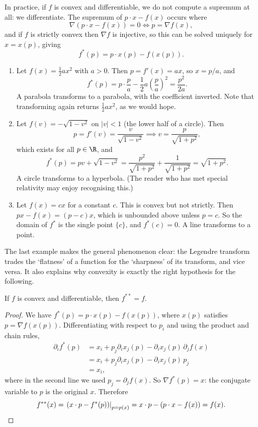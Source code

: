 \documentclass[a4paper]{scrartcl}
\begin{document}
In practice, if $f$ is convex and differentiable, we do not compute a supremum at all: we differentiate. The supremum of $p\cdot x - f(x)$ occurs where
$$
\nabla\left(p\cdot x - f(x)\right) = 0 \iff p = \nabla f(x),
$$
and if $f$ is strictly convex then $\nabla f$ is injective, so this can be solved uniquely for $x = x(p)$, giving
$$
f^*(p) = p\cdot x(p) - f(x(p)).
$$

\begin{example}\leavevmode
	\begin{enumerate}[label=(\roman*)]
		\item Let $f(x) = \frac{1}{2}ax^2$ with $a > 0$. Then $p = f'(x) = ax$, so $x = p/a$, and
		$$
		f^*(p) = p\cdot\frac{p}{a} - \frac{1}{2}a\left(\frac{p}{a}\right)^2 = \frac{p^2}{2a}.
		$$
		A parabola transforms to a parabola, with the coefficient inverted. Note that transforming again returns $\frac{1}{2}ax^2$, as we would hope.
		\item Let $f(v) = -\sqrt{1 - v^2}$ on $|v| < 1$ (the lower half of a circle). Then
		$$
		p = f'(v) = \frac{v}{\sqrt{1 - v^2}} \implies v = \frac{p}{\sqrt{1 + p^2}},
		$$
		which exists for all $p \in \R$, and
		$$
		f^*(p) = pv + \sqrt{1 - v^2} = \frac{p^2}{\sqrt{1+p^2}} + \frac{1}{\sqrt{1+p^2}} = \sqrt{1 + p^2}.
		$$
		A circle transforms to a hyperbola. (The reader who has met special relativity may enjoy recognising this.)
		\item Let $f(x) = cx$ for a constant $c$. This is convex but not strictly. Then $px - f(x) = (p - c)x$, which is unbounded above unless $p = c$. So the domain of $f^*$ is the single point $\{c\}$, and $f^*(c) = 0$. A line transforms to a point.
	\end{enumerate}
\end{example}

The last example makes the general phenomenon clear: the Legendre transform trades the `flatness' of a function for the `sharpness' of its transform, and vice versa. It also explains why convexity is exactly the right hypothesis for the following.

\begin{theorem}
	If $f$ is convex and differentiable, then $f^{**} = f$.
\end{theorem}
\begin{proof}
	We have $f^*(p) = p \cdot x(p) - f(x(p))$, where $x(p)$ satisfies $p = \nabla f(x(p))$. Differentiating with respect to $p_i$ and using the product and chain rules,
	\begin{align*}
		\partial_i f^*(p) &= x_i + p_j \partial_i x_j(p) - \partial_i x_j(p)\,\partial_j f(x) \\
		&= x_i + p_j \partial_i x_j(p) - \partial_i x_j(p)\, p_j \\
		&= x_i,
	\end{align*}
	where in the second line we used $p_j = \partial_j f(x)$. So $\nabla f^*(p) = x$: the conjugate variable to $p$ is the original $x$. Therefore
	\[
	f^{**}(x) = \left.\left(x\cdot p - f^*(p)\right)\right|_{p = p(x)} = x\cdot p - \left(p\cdot x - f(x)\right) = f(x). \qedhere
	\]
\end{proof}
\end{document}
